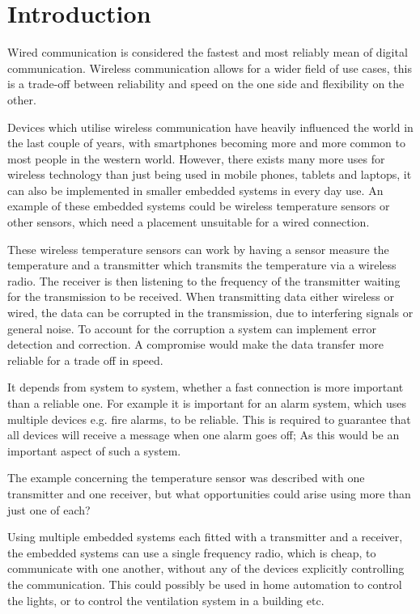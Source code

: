 \chapter{Introduction}
\vspace{-20pt}
Wired communication is considered the fastest and  most reliably mean of digital communication.
Wireless communication allows for a wider field of use cases, this is a trade-off between reliability and speed on the one side and flexibility on the other. \cite{wirelessTradeoffs}

Devices which utilise wireless communication have heavily influenced the world in the last couple of years, with smartphones becoming more and more common to most people in the western world. \cite{2013-SmartPhoneUse}
However, there exists many more uses for wireless technology than just being used in mobile phones, tablets and laptops, it can also be implemented in smaller embedded systems in every day use.
An example of these embedded systems could be wireless temperature sensors or other sensors, which need a placement unsuitable for a wired connection.

These wireless temperature sensors can work by having a sensor measure the temperature and a transmitter which transmits the temperature via a wireless radio.
The receiver is then listening to the frequency of the transmitter waiting for the transmission to be received.
When transmitting data either wireless or wired, the data can be corrupted in the transmission, due to interfering signals or general noise.
To account for the corruption a system can implement error detection and correction.
A compromise would make the data transfer more reliable for a trade off in speed.

It depends from system to system, whether a fast connection is more important than a reliable one.
For example it is important for an alarm system, which uses multiple devices e.g. fire alarms, to be reliable.
This is required to guarantee that all devices will receive a message when one alarm goes off;
As this would be an important aspect of such a system.

The example concerning the temperature sensor was described with one transmitter and one receiver, but what opportunities could arise using more than just one of each?

\bigskip

Using multiple embedded systems each fitted with a transmitter and a receiver, the embedded systems can use a single frequency radio, which is cheap, to communicate with one another, without any of the devices explicitly controlling the communication.
This could possibly be used in home automation to control the lights, or to control the ventilation system in a building etc.
